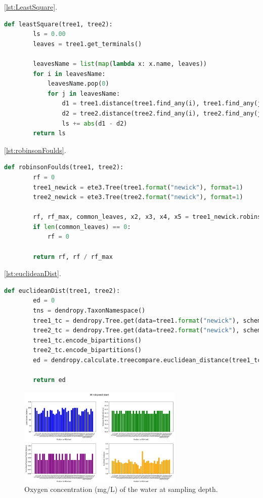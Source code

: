 \autoref{lst:LeastSquare}.
\begin{lstlisting}[label=lst:LeastSquare,language=Python,caption=aPhyloGeo’s leastSquare function]
    def leastSquare(tree1, tree2):
        ls = 0.00
        leaves = tree1.get_terminals()

        leavesName = list(map(lambda x: x.name, leaves))
        for i in leavesName:
            leavesName.pop(0)
            for j in leavesName:
                d1 = tree1.distance(tree1.find_any(i), tree1.find_any(j))
                d2 = tree2.distance(tree2.find_any(i), tree2.find_any(j))
                ls += abs(d1 - d2)
        return ls
\end{lstlisting}


\autoref{lst:robinsonFoulds}.
\begin{lstlisting}[label=lst:robinsonFoulds,language=Python,caption=aPhyloGeo’s robinsonFoulds function]
    def robinsonFoulds(tree1, tree2):
        rf = 0
        tree1_newick = ete3.Tree(tree1.format("newick"), format=1)
        tree2_newick = ete3.Tree(tree2.format("newick"), format=1)

        rf, rf_max, common_leaves, x2, x3, x4, x5 = tree1_newick.robinson_foulds(tree2_newick, unrooted_trees=True)
        if len(common_leaves) == 0:
            rf = 0

        return rf, rf / rf_max
\end{lstlisting}

\autoref{lst:euclideanDist}.
\begin{lstlisting}[label=lst:euclideanDist,language=Python,caption=aPhyloGeo’s euclideanDist function]
    def euclideanDist(tree1, tree2):
        ed = 0
        tns = dendropy.TaxonNamespace()
        tree1_tc = dendropy.Tree.get(data=tree1.format("newick"), schema="newick", taxon_namespace=tns)
        tree2_tc = dendropy.Tree.get(data=tree2.format("newick"), schema="newick", taxon_namespace=tns)
        tree1_tc.encode_bipartitions()
        tree2_tc.encode_bipartitions()
        ed = dendropy.calculate.treecompare.euclidean_distance(tree1_tc, tree2_tc)

        return ed
\end{lstlisting}

\begin{figure}[]
    \centering
    \includegraphics[width=0.7\textwidth]{figure5.png}
    \caption{Oxygen concentration (mg/L) of the water at sampling depth. \label{fig:fig1e}}
\end{figure}

